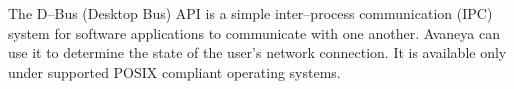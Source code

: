 

\startitemize[4]

The D--Bus (Desktop Bus) API is a simple inter--process communication (IPC) system for software applications to communicate with one another. Avaneya can use it to determine the state of the user's network connection. It is available only under supported POSIX compliant operating systems.
\stopitemize

